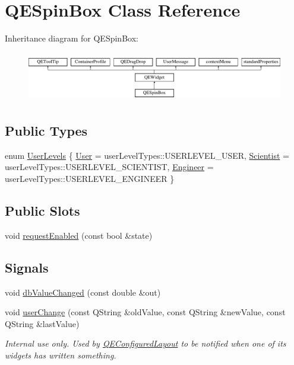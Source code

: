\hypertarget{classQESpinBox}{
\section{QESpinBox Class Reference}
\label{classQESpinBox}
}
Inheritance diagram for QESpinBox:\begin{figure}[H]
\begin{center}
\leavevmode
\includegraphics[height=2.204725cm]{classQESpinBox}
\end{center}
\end{figure}
\subsection*{Public Types}
\begin{DoxyCompactItemize}
\item 
enum \hyperlink{classQESpinBox_a27e69a31dc1ff8835542c057926b3eed}{UserLevels} \{ \hyperlink{classQESpinBox_a27e69a31dc1ff8835542c057926b3eeda238f8727a9ac147ae3a162e1f2dbd6c8}{User} =  userLevelTypes::USERLEVEL\_\-USER, 
\hyperlink{classQESpinBox_a27e69a31dc1ff8835542c057926b3eedaaa99380701916297730c9b5dbe32055a}{Scientist} =  userLevelTypes::USERLEVEL\_\-SCIENTIST, 
\hyperlink{classQESpinBox_a27e69a31dc1ff8835542c057926b3eeda750ffdebccb2a6d9e6af45842a2081bc}{Engineer} =  userLevelTypes::USERLEVEL\_\-ENGINEER
 \}
\end{DoxyCompactItemize}
\subsection*{Public Slots}
\begin{DoxyCompactItemize}
\item 
void \hyperlink{classQESpinBox_ab0bc8bada6b080d7f5c79802b9933a7c}{requestEnabled} (const bool \&state)
\end{DoxyCompactItemize}
\subsection*{Signals}
\begin{DoxyCompactItemize}
\item 
void \hyperlink{classQESpinBox_af4f96898210c30160360e1f2df82efba}{dbValueChanged} (const double \&out)
\item 
\hypertarget{classQESpinBox_ad35ce8ff059dc05c3229a84ea42351a7}{
void \hyperlink{classQESpinBox_ad35ce8ff059dc05c3229a84ea42351a7}{userChange} (const QString \&oldValue, const QString \&newValue, const QString \&lastValue)}
\label{classQESpinBox_ad35ce8ff059dc05c3229a84ea42351a7}

\begin{DoxyCompactList}\small\item\em Internal use only. Used by \hyperlink{classQEConfiguredLayout}{QEConfiguredLayout} to be notified when one of its widgets has written something. \end{DoxyCompactList}\end{DoxyCompactItemize}

